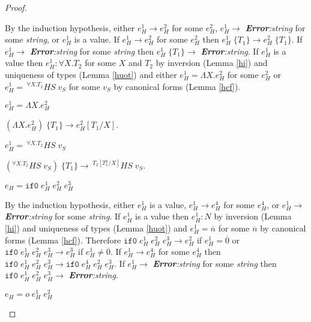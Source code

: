 \begin{theorem}
\begin{proof}
\begin{case}
By the induction hypothesis, either $e_{H}^{1}\rightarrow e_{H}^{2}$ for some $e_{H}^{2}$, $e_{H}^{1}\rightarrow$ \emph{\textbf{Error}:\;string} for some \emph{string}, or $e_{H}^{1}$ is a value.  If $e_{H}^{1}\rightarrow e_{H}^{2}$ for some $e_{H}^{2}$ then $e_{H}^{1}\;\lbrace T_{1}\rbrace\rightarrow e_{H}^{2}\;\lbrace T_{1}\rbrace$.  If $e_{H}^{1}\rightarrow$ \emph{\textbf{Error}:\;string} for some \emph{string} then $e_{H}^{1}\;\lbrace T_{1}\rbrace\rightarrow$ \emph{\textbf{Error}:\;string}.  If $e_{H}^{1}$ is a value then $e_{H}^{1}:\forall X.T_{2}$ for some $X$ and $T_{2}$ by inversion (Lemma \ref{hi}) and uniqueness of types (Lemma \ref{huot}) and either $e_{H}^{1}=\Lambda X.e_{H}^{2}$ for some $e_{H}^{2}$ or $e_{H}^{1}=\,^{\forall X.T_{2}}HS\;v_{S}$ for some $v_{S}$ by canonical forms (Lemma \ref{hcf}).
\end{case}
\begin{case}
$e_{H}^{1}=\Lambda X.e_{H}^{2}$

$(\Lambda X.e_{H}^{2})\;\lbrace T_{1}\rbrace\rightarrow e_{H}^{2}[T_{1}/X]$.
\end{case}
\begin{case}
$e_{H}^{1}=\,^{\forall X.T_{2}}HS\;v_{S}$

$(^{\forall X.T_{2}}HS\;v_{S})\;\lbrace T_{1}\rbrace\rightarrow\,^{T_{2}[T_{1}^{a}/X]}HS\;v_{S}$.
\end{case}
\begin{case}
$e_{H}=\mathtt{if0}\;e_{H}^{1}\;e_{H}^{2}\;e_{H}^{3}$

By the induction hypothesis, either $e_{H}^{1}$ is a value, $e_{H}^{1}\rightarrow e_{H}^{4}$ for some $e_{H}^{4}$, or $e_{H}^{1}\rightarrow$ \emph{\textbf{Error}:\;string} for some \emph{string}.  If $e_{H}^{1}$ is a value then $e_{H}^{1}:N$ by inversion (Lemma \ref{hi}) and uniqueness of types (Lemma \ref{huot}) and $e_{H}^{1}=\overline{n}$ for some $\overline{n}$ by canonical forms (Lemma \ref{hcf}).  Therefore $\mathtt{if0}\;e_{H}^{1}\;e_{H}^{2}\;e_{H}^{3}\rightarrow e_{H}^{2}$ if $e_{H}^{1}=\overline{0}$ or $\mathtt{if0}\;e_{H}^{1}\;e_{H}^{2}\;e_{H}^{3}\rightarrow e_{H}^{3}$ if $e_{H}^{1}\neq\overline{0}$.  If $e_{H}^{1}\rightarrow e_{H}^{4}$ for some $e_{H}^{4}$ then $\mathtt{if0}\;e_{H}^{1}\;e_{H}^{2}\;e_{H}^{3}\rightarrow \mathtt{if0}\;e_{H}^{4}\;e_{H}^{2}\;e_{H}^{3}$.  If $e_{H}^{1}\rightarrow$ \emph{\textbf{Error}:\;string} for some \emph{string} then $\mathtt{if0}\;e_{H}^{1}\;e_{H}^{2}\;e_{H}^{3}\rightarrow$ \emph{\textbf{Error}:\;string}.
\end{case}
\begin{case}
$e_{H}=o\;e_{H}^{1}\;e_{H}^{2}$


\end{case}
\end{proof}
\end{theorem}
